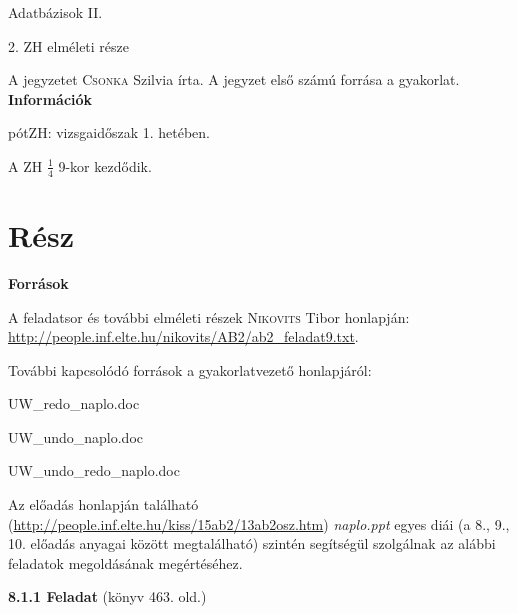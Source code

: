 \documentclass[a4paper,11.5pt, table]{article}
\begin{document}
	\begin{center}
		{\LARGE Adatbázisok II.}
		\smallskip
		
		{\large 2. ZH elméleti része}
	\end{center}
	A jegyzetet \textsc{Csonka} Szilvia írta. A jegyzet első számú forrása a gyakorlat.\\
	
	
	
	
	
	\textbf{Információk}
	\begin{compactitem}
		\item pótZH: vizsgaidőszak 1. hetében.
		\item A ZH $\frac{1}{4}$ 9-kor kezdődik.
	\end{compactitem}
	
	\section{Rész}
	
	\textbf{Források}
	\begin{compactitem}
	\item A feladatsor és további elméleti részek \textsc{Nikovits} Tibor honlapján: \url{http://people.inf.elte.hu/nikovits/AB2/ab2_feladat9.txt}.
	
	\item További kapcsolódó források a gyakorlatvezető honlapjáról:
	\begin{compactitem}
		\item UW\_redo\_naplo.doc
		\item UW\_undo\_naplo.doc
		\item UW\_undo\_redo\_naplo.doc
	\end{compactitem}
	
	\item Az előadás honlapján található (\url{http://people.inf.elte.hu/kiss/15ab2/13ab2osz.htm}) \textit{naplo.ppt} egyes diái (a 8., 9., 10. előadás anyagai között megtalálható) szintén segítségül szolgálnak az alábbi feladatok megoldásának megértéséhez. 
	\end{compactitem}
	
	
	\textbf{8.1.1 Feladat} (könyv 463. old.)
	
\end{document}
